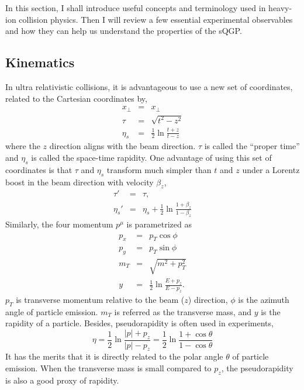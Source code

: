In this section, I shall introduce useful concepts and terminology used in heavy-ion collision physics.
Then I will review a few essential experimental observables and how they can help us understand the properties of the sQGP.

\subsection{Kinematics}
In ultra relativistic collisions, it is advantageous to use a new set of coordinates, related to the Cartesian coordinates by,
\begin{eqnarray}
x_\perp &=& x_\perp\\
\tau &=& \sqrt{t^2 - z^2}\\
\eta_s &=& \frac{1}{2}\ln\frac{t+z}{t-z}
\end{eqnarray}
where the $z$ direction aligns with the beam direction.
$\tau$ is called the ``proper time'' and $\eta_s$ is called the space-time rapidity.
One advantage of using this set of coordinates is that $\tau$ and $\eta_s$ transform much simpler than $t$ and $z$ under a Lorentz boost in the beam direction with velocity $\beta_z$,
\begin{eqnarray}
\tau' &=& \tau,\\
\eta_s' &=& \eta_s + \frac{1}{2}\ln\frac{1+\beta_z}{1-\beta_z}
\end{eqnarray}
Similarly, the four momentum $p^\mu$ is parametrized as 
\begin{eqnarray}
p_x &=& p_T\cos\phi\\
p_y &=& p_T\sin\phi\\
m_T &=& \sqrt{m^2 + p_T^2}\\
y &=& \frac{1}{2}\ln\frac{E+p_z}{E-p_z}.
\end{eqnarray}
$p_T$ is transverse momentum relative to the beam ($z$) direction, $\phi$ is the azimuth angle of particle emission. 
$m_T$ is referred as the transverse mass, and $y$ is the rapidity of a particle.
Besides, pseudorapidity is often used in experiments,
\begin{equation}
\eta = \frac{1}{2}\ln\frac{|p|+p_z}{|p|-p_z} = \frac{1}{2}\ln\frac{1+\cos\theta}{1-\cos\theta}
\end{equation}
It has the merits that it is directly related to the polar angle  $\theta$ of particle emission.
When the transverse mass is small compared to $p_z$, the pseudorapidity is also a good proxy of rapidity.

